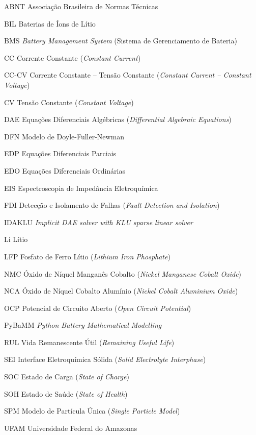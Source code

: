 \documentclass[
    12pt,
    openright,
    twoside,
    a4paper,
    brazil,
    english
]{abntex2}
\begin{document}
\listoftables*
\cleardoublepage

\begin{siglas}
  \item[ABNT] Associação Brasileira de Normas Técnicas
  \item[BIL]  Baterias de Íons de Lítio
  \item[BMS]  \textit{Battery Management System} (Sistema de Gerenciamento de Bateria)
  \item[CC]   Corrente Constante (\textit{Constant Current})
  \item[CC-CV] Corrente Constante -- Tensão Constante (\textit{Constant Current -- Constant Voltage})
  \item[CV]   Tensão Constante (\textit{Constant Voltage})
  \item[DAE]  Equações Diferenciais Algébricas (\textit{Differential Algebraic Equations})
  \item[DFN]  Modelo de Doyle-Fuller-Newman
  \item[EDP]  Equações Diferenciais Parciais
  \item[EDO]  Equações Diferenciais Ordinárias
  \item[EIS]  Espectroscopia de Impedância Eletroquímica
  \item[FDI]  Detecção e Isolamento de Falhas (\textit{Fault Detection and Isolation})
  \item[IDAKLU] \textit{Implicit DAE solver with KLU sparse linear solver}
  \item[Li]   Lítio
  \item[LFP]  Fosfato de Ferro Lítio (\textit{Lithium Iron Phosphate})
  \item[NMC]  Óxido de Níquel Manganês Cobalto (\textit{Nickel Manganese Cobalt Oxide})
  \item[NCA]  Óxido de Níquel Cobalto Alumínio (\textit{Nickel Cobalt Aluminium Oxide})
  \item[OCP]  Potencial de Circuito Aberto (\textit{Open Circuit Potential})
  \item[PyBaMM] \textit{Python Battery Mathematical Modelling}
  \item[RUL]  Vida Remanescente Útil (\textit{Remaining Useful Life})
  \item[SEI]  Interface Eletroquímica Sólida (\textit{Solid Electrolyte Interphase})
  \item[SOC]  Estado de Carga (\textit{State of Charge})
  \item[SOH]  Estado de Saúde (\textit{State of Health})
  \item[SPM]  Modelo de Partícula Única (\textit{Single Particle Model})
  \item[UFAM] Universidade Federal do Amazonas
\end{siglas}
\end{document}
